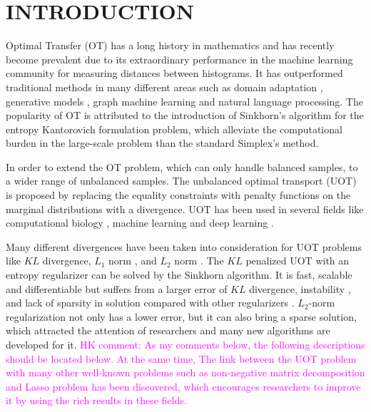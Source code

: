 \documentclass[twoside]{article}
\theoremstyle{plain}
\newcommand{\note}[1]{\textcolor{magenta}{#1}}
\begin{document}
\section{INTRODUCTION}
Optimal Transfer (OT) has a long history in mathematics and has recently become prevalent due to its extraordinary performance in the machine learning community for measuring distances between histograms. It has outperformed traditional methods in many different areas such as domain adaptation \citep{7586038}, generative models \citep{arjovsky2017wasserstein}, graph machine learning \citep{NEURIPS2019_fdd5b16f} and natural language processing. \citep{084adf2f555549c493e0331a00e4ecad} The popularity of OT is attributed to the introduction of Sinkhorn's algorithm \citep{10.2307/2040061} for the entropy Kantorovich formulation problem, \citep{NIPS2013_af21d0c9} which alleviate the computational burden in the large-scale problem than the standard Simplex's method. 

In order to extend the OT problem, which can only handle balanced samples, to a wider range of unbalanced samples. The unbalanced optimal transport (UOT) is proposed by replacing the equality constraints with penalty functions on the marginal distributions with a divergence. UOT has been used in several fields like computational biology \citep{SCHIEBINGER2019928} , machine learning \citep{DBLP:conf/aistats/JanatiCG19} and deep learning \citep{DBLP:conf/iclr/YangU19}. 

Many different divergences have been taken into consideration for UOT problems like $KL$ \citep{Liero:2018wo} divergence, $L_1$ norm \citep{10.2307/20752228}, and $L_2$ norm \citep{refId0}. The $KL$ penalized UOT with an entropy regularizer can be solved by the Sinkhorn algorithm. It is fast, scalable and differentiable but suffers from a larger error of $KL$ divergence, instability \citep{DBLP:journals/corr/Schmitzer16}, and lack of sparsity in solution compared with other regularizers \citep{DBLP:conf/aistats/BlondelSR18}. $L_2$-norm regularization not only has a lower error, but it can also bring a sparse solution, which attracted the attention of researchers and many new algorithms are developed for it. \citep{DBLP:conf/aistats/BlondelSR18, NEURIPS2021_c3c617a9, https://doi.org/10.48550/arxiv.2202.03618} \note{HK comment: As my comments below, the following descriptions should be located below. At the same time, The link between the UOT problem with many other well-known problems such as non-negative matrix decomposition and Lasso problem has been discovered, which encourages researchers to improve it by using the rich results in these fields.}
\end{document}
